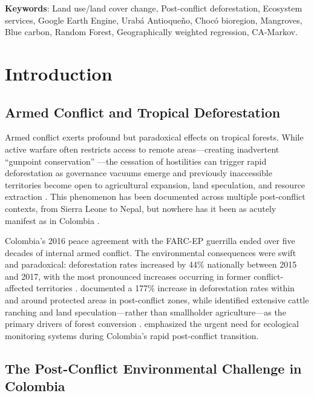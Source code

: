 \documentclass[12pt,a4paper]{article}
\begin{document}
\textbf{Keywords}: Land use/land cover change, Post-conflict deforestation, Ecosystem services, Google Earth Engine, Urab\'{a} Antioque\~{n}o, Choc\'{o} bioregion, Mangroves, Blue carbon, Random Forest, Geographically weighted regression, CA-Markov.


\section{Introduction}

\subsection{Armed Conflict and Tropical Deforestation}

Armed conflict exerts profound but paradoxical effects on tropical forests. While active warfare often restricts access to remote areas---creating inadvertent ``gunpoint conservation'' \citep{Alvarez2003}---the cessation of hostilities can trigger rapid deforestation as governance vacuums emerge and previously inaccessible territories become open to agricultural expansion, land speculation, and resource extraction \citep{Prem2020,Clerici2020}. This phenomenon has been documented across multiple post-conflict contexts, from Sierra Leone to Nepal, but nowhere has it been as acutely manifest as in Colombia \citep{Fagan2020,CastroNunez2022,MurilloSandoval2021}.

Colombia's 2016 peace agreement with the FARC-EP guerrilla ended over five decades of internal armed conflict. The environmental consequences were swift and paradoxical: deforestation rates increased by 44\% nationally between 2015 and 2017, with the most pronounced increases occurring in former conflict-affected territories \citep{IDEAM2018,Prem2020}. \citet{Clerici2020} documented a 177\% increase in deforestation rates within and around protected areas in post-conflict zones, while \citet{CastroNunez2022} identified extensive cattle ranching and land speculation---rather than smallholder agriculture---as the primary drivers of forest conversion \citep[see also][]{Pacheco2009,Negret2019}. \citet{Sierra2017} emphasized the urgent need for ecological monitoring systems during Colombia's rapid post-conflict transition.

\subsection{The Post-Conflict Environmental Challenge in Colombia}
\end{document}
